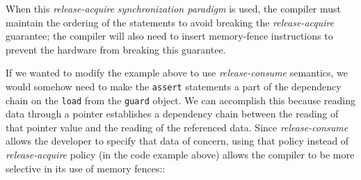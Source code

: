 \noindent When this \emph{release-acquire} \emph{synchronization paradigm} is
used, the compiler must maintain the ordering of the statements to avoid
breaking the \emph{release-acquire} guarantee; the compiler will also
need to insert memory-fence instructions to prevent the hardware from
breaking this guarantee.

If we wanted to modify the example above to use \emph{release-consume}
semantics, we would somehow need to make the \lstinline!assert! statements
a part of the dependency chain on the \lstinline!load! from the
\lstinline!guard! object. We can accomplish this because reading data
through a pointer establishes a dependency chain between the reading of
that pointer value and the reading of the referenced data.  Since \emph{release-consume} allows the developer to specify that data of concern, using that policy instead of \emph{release-acquire} policy (in the code example above) allows the compiler to be more selective in its use of memory fences::


